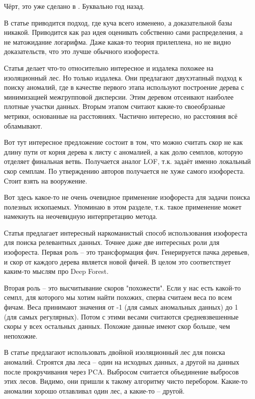 \documentclass[12pt]{article}
\begin{document}
Чёрт, это уже сделано в
\cite{lesoupleGeneralizedIsolationForest2021}
. Буквально год назад.


В статье
\cite{wuRSForestRapidDensity2014}
приводится подход, где куча всего изменено, а доказательной базы никакой.
Приводится как раз идея оценивать собственно сами распределения, а не матожидание
логарифма. Даже какая-то теория прилеплена, но не видно доказательств, что это
лучше обычного изофореста.

Статья
\cite{yuFilteringRefinementTwoStage2009}
делает что-то относительно интересное и издалека похожее на изоляционный лес. Но только
издалека. Они предлагают двухэтапный подход к поиску аномалий, где в качестве первого этапа
используют построение дерева с минимизацией межгрупповой дисперсии. Этим деревом отсеивают
наиболее плотные участки данных. Вторым этапом считают какие-то своеобрзаные метрики,
основанные на расстояниях. Частично интересно, но расстояния всё обламывают.

Вот тут
\cite{aryalImprovingIForestRelative2014}
интересное предложение
состоит в том, что можно считать скор не как длину пути от корня дерева к листу с аномалией,
а как долю семплов, которую отделяет финальная ветвь. Получается аналог LOF, т.к. задаёт
именно локальный скор семплам. По утверждению авторов получается не хуже самого изофореста.
Стоит взять на вооружение.

Вот здесь
\cite{chenIsolationForestAlternative2019}
какое-то не очень очевидное применение изофореста для задачи поиска полезных ископаемых.
Упоминаю в этом разделе, т.к. такое применение может намекнуть на неочевидную интерпретацию
метода.

Статья
\cite{zhouRelevanceFeatureMapping2012}
предлагает интересный наркоманистый способ использования изофореста для поиска релевантных
данных. Точнее даже две интересных роли для изофореста. Первая роль -- это трансформация
фич. Генерируется пачка деревьев, и скор от каждого дерева является новой фичей. В целом
это соответствует каким-то мыслям про Deep Forest.

Вторая роль -- это высчитывание скоров "похожести". Если у нас есть какой-то семпл, для которого
мы хотим найти похожих, сперва считаем веса по всем фичам. Веса принимают значения от -1 (для самых аномальных данных) до 1 (для самых регулярных).
Потом с этими весами считаются средневзвешенные скоры у всех остальных данных. Похожие данные
имеют скор больше, чем непохожие.

В статье
\cite{elnourDualIsolationForestsBasedAttackDetection2020}
предлагают использовать двойной изоляционный лес для поиска аномалий. Строятся два леса --
один на исходных данных, а другой на данных после прокручивания через PCA. Выбросом
считается объединение выбросов этих лесов. Видимо, они пришли к такому алгоритму чисто
перебором. Какие-то аномалии хорошо отлавливал один лес, а какие-то -- другой.
\end{document}
